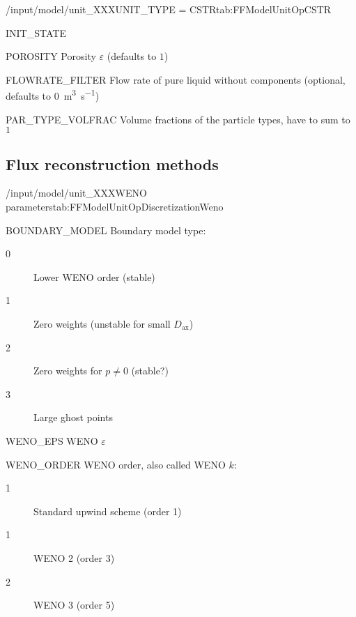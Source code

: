 \begin{condsubgroup}{/input/model/unit\_XXX}{UNIT\_TYPE = CSTR}{tab:FFModelUnitOpCSTR}
\begin{dataset}[unit=various,type=double,range={$\mathds{R}$},length={\texttt{NDOF} / $2\texttt{NDOF}$}]{INIT\_STATE}
  \end{dataset}
  \begin{dataset}[unit=--,type=double,range={$(0,1]$},length={1}]{POROSITY}
    Porosity $\varepsilon$ (defaults to $1$)
  \end{dataset}
  \begin{dataset}[unit=\si{\cubic\metre\per\second},type=double,range={$\geq 0$},length={$1$ / \texttt{NSEC}}]{FLOWRATE\_FILTER}
    Flow rate of pure liquid without components (optional, defaults to \SI{0}{\cubic\metre\per\second})
  \end{dataset}
  \begin{dataset}[unit=--,type=double,range={$[0,1]$},length={\texttt{NPARTYPE}}]{PAR\_TYPE\_VOLFRAC}
    Volume fractions of the particle types, have to sum to $1$
  \end{dataset}
\end{condsubgroup}

\subsection{Flux reconstruction methods}

\begin{subgroup}{/input/model/unit\_XXX}{WENO parameters}{tab:FFModelUnitOpDiscretizationWeno}
  \begin{dataset}[type=int,range={$\{ 0,1,2,3 \}$},length=1]{BOUNDARY\_MODEL}
    Boundary model type:
    \begin{description}
      \item[0] Lower WENO order (stable)
      \item[1] Zero weights (unstable for small $D_{\mathrm{ax}}$)
      \item[2] Zero weights for $p \neq 0$ (stable?)
      \item[3] Large ghost points
    \end{description}\vspace{-\baselineskip}
  \end{dataset}
  \begin{dataset}[type=double,range={$\geq 0$},length=1]{WENO\_EPS}
    WENO $\varepsilon$
  \end{dataset}
  \begin{dataset}[type=int,range={$\{ 1,2,3 \}$},length=1]{WENO\_ORDER}
    WENO order, also called WENO $k$:
    \begin{description}
      \item[1] Standard upwind scheme (order 1)
      \item[1] WENO 2 (order 3)
      \item[2] WENO 3 (order 5)
    \end{description}\vspace{-\baselineskip}
  \end{dataset}
\end{subgroup}


